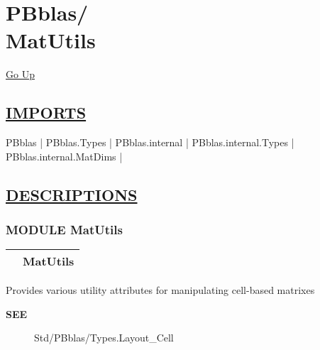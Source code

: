 \chapter*{\color{headfile}
{\large PBblas\slash\hspace{0pt}}
 \\
MatUtils
}
\hypertarget{ecldoc:toc:PBblas.MatUtils}{}
\hyperlink{ecldoc:toc:root/PBblas}{Go Up}

\section*{\underline{\textsf{IMPORTS}}}
\begin{doublespace}
{\large
PBblas |
PBblas.Types |
PBblas.internal |
PBblas.internal.Types |
PBblas.internal.MatDims |
}
\end{doublespace}

\section*{\underline{\textsf{DESCRIPTIONS}}}
\subsection*{\textsf{\colorbox{headtoc}{\color{white} MODULE}
MatUtils}}

\hypertarget{ecldoc:PBblas.MatUtils}{}

{\renewcommand{\arraystretch}{1.5}
\begin{tabularx}{\textwidth}{|>{\raggedright\arraybackslash}l|X|}
\hline
\hspace{0pt}\mytexttt{\color{red} } & \textbf{MatUtils} \\
\hline
\end{tabularx}
}

\par





Provides various utility attributes for manipulating cell-based matrixes









\par
\begin{description}
\item [\colorbox{tagtype}{\color{white} \textbf{\textsf{SEE}}}] Std/PBblas/Types.Layout\_Cell
\end{description}




